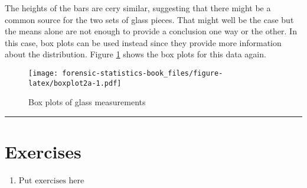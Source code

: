 \documentclass[
]{book}
\providecommand{\tightlist}{%
  \setlength{\itemsep}{0pt}\setlength{\parskip}{0pt}}
\begin{document}
The heights of the bars are cery similar, suggesting that there might be
a common source for the two sets of glass pieces. That might well be the
case but the means alone are not enough to provide a conclusion one way or
the other. In this case, box plots can be used instead since they provide
more information about the distribution. Figure \ref{fig:boxplot2a}
shows the box plots for this data again.

\begin{figure}
\centering
\texttt{[image: forensic-statistics-book\_files/figure-latex/boxplot2a-1.pdf]}
\caption{\label{fig:boxplot2a}Box plots of glass measurements}
\end{figure}

\begin{center}\rule{0.5\linewidth}{0.5pt}\end{center}

\hypertarget{exercises-5}{%
\section{Exercises}\label{exercises-5}}

\begin{enumerate}
\def\labelenumi{\arabic{enumi}.}
\tightlist
\item
  \(\text{Put exercises here}\)
\end{enumerate}

  
\end{document}
